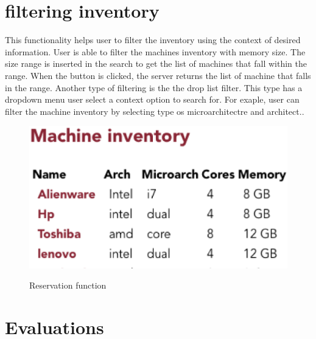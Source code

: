 \section*{filtering inventory}
This functionality helps user to filter the inventory using the context of desired information. User is able to filter the machines inventory with memory size. The size range is inserted in the search to get the list of machines that fall within the range. When the button is clicked, the  server returns the list of machine that falls in the range. Another type of filtering is the the drop list filter. This type has a dropdown menu user select a context option to search for. For exaple, user can filter the machine inventory by selecting type os microarchitectre and architect..\begin{figure}[h]
  \includegraphics[width=\linewidth]{update.eps}
  \label{fig:reserve}
  \caption{Reservation function}
\end{figure}
\pagebreak


\section{Evaluations}
